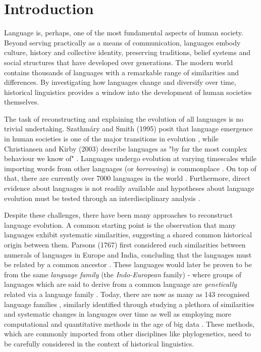 \chapter{Introduction}
\label{sec:introduction}
Language is, perhaps, one of the most fundamental aspects of human society. Beyond serving practically as a means of communication, languages embody culture, history and collective identity, preserving traditions, belief systems and social structures that have developed over generations. The modern world contains thousands of languages with a remarkable range of similarities and differences. By investigating how languages change and diversify over time, historical linguistics provides a window into the development of human societies themselves.

The task of reconstructing and explaining the evolution of all languages is no trivial undertaking. Szathmáry and Smith (1995) posit that language emergence in human societies is one of the major transitions in evolution \cite{Szathmary1995}, while Christiansen and Kirby (2003) describe languages as "by far the most complex behaviour we know of" \cite{Christiansen2003}. Languages undergo evolution at varying timescales \cite{Christiansen2003} while importing words from other languages (or \textit{borrowing}) is commonplace \cite{Campbell2004}. On top of that, there are currently over 7000 languages in the world \cite{Ethnologue}. Furthermore, direct evidence about languages is not readily available and hypotheses about language evolution must be tested through an interdisciplinary analysis \cite{Christiansen2003}.

Despite these challenges, there have been many approaches to reconstruct language evolution. A common starting point is the observation that many languages exhibit systematic similarities, suggesting a shared common historical origin between them. 
Parsons (1767) first considered such similarities between numerals of languages in Europe and India, concluding that the languages must be related by a common ancestor \cite{Parsons1767}. These languages would later be proven to be from the same \textit{language family} (the \textit{Indo-European} family) \cite{Bopp1816} - where groups of languages which are said to derive from a common language are \textit{genetically} related via a language family \cite{Rowe2015}. Today, there are now as many as 143 recognised language families \cite{Ethnologue}, similarly identified through studying a plethora of similarities and systematic changes in languages over time \cite{Campbell2004} as well as employing more computational and quantitative methods in the age of big data \cite{Bhattacharya2018}. These methods, which are commonly imported from other disciplines like phylogenetics, need to be carefully considered in the context of historical linguistics.

